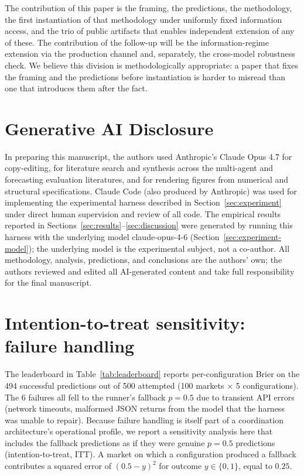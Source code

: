 \documentclass[11pt]{article}
\begin{document}
The contribution of this paper is the framing, the predictions, the methodology, the first instantiation of that methodology under uniformly fixed information access, and the trio of public artifacts that enables independent extension of any of these. The contribution of the follow-up will be the information-regime extension via the production channel and, separately, the cross-model robustness check. We believe this division is methodologically appropriate: a paper that fixes the framing and the predictions before instantiation is harder to misread than one that introduces them after the fact.

\section*{Generative AI Disclosure}
\label{sec:ai-disclosure}

In preparing this manuscript, the authors used Anthropic's Claude Opus 4.7 for copy-editing, for literature search and synthesis across the multi-agent and forecasting evaluation literatures, and for rendering figures from numerical and structural specifications. Claude Code (also produced by Anthropic) was used for implementing the experimental harness described in Section~\ref{sec:experiment} under direct human supervision and review of all code. The empirical results reported in Sections~\ref{sec:results}--\ref{sec:discussion} were generated by running this harness with the underlying model claude-opus-4-6 (Section~\ref{sec:experiment-model}); the underlying model is the experimental subject, not a co-author. All methodology, analysis, predictions, and conclusions are the authors' own; the authors reviewed and edited all AI-generated content and take full responsibility for the final manuscript.




\appendix

\section{Intention-to-treat sensitivity: failure handling}
\label{app:itt}

The leaderboard in Table~\ref{tab:leaderboard} reports per-configuration Brier on the 494 successful predictions out of 500 attempted (100 markets $\times$ 5 configurations). The 6 failures all fell to the runner's fallback $p = 0.5$ due to transient API errors (network timeouts, malformed JSON returns from the model that the harness was unable to repair). Because failure handling is itself part of a coordination architecture's operational profile, we report a sensitivity analysis here that includes the fallback predictions as if they were genuine $p = 0.5$ predictions (intention-to-treat, ITT). A market on which a configuration produced a fallback contributes a squared error of $(0.5 - y)^2$ for outcome $y \in \{0, 1\}$, equal to $0.25$.
\end{document}
